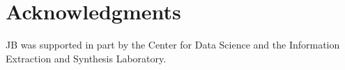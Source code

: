 \section{Acknowledgments}
JB was supported in part by the Center for Data Science and the Information Extraction and Synthesis Laboratory.
